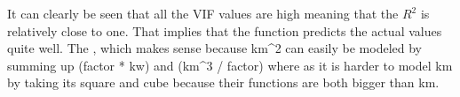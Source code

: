 \noindent
It can clearly be seen that all the VIF values are high meaning that the $R^2$ is relatively close to one. That implies that the function predicts the actual values quite well. The , which makes sense because km^2 can easily be modeled by summing up  (factor * kw) and (km^3 / factor) where as it is harder to model km by taking its square and cube because their functions are both bigger than km.


